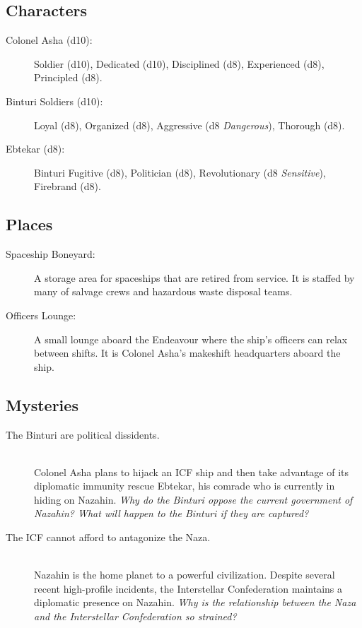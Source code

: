\documentclass[11pt, a5paper, parskip=half-, DIV=12]{scrartcl}
\begin{document}
\newpage

\subsection*{Characters}
\begin{description}
	\item[Colonel Asha (d10):] Soldier (d10), Dedicated (d10), Disciplined (d8), Experienced (d8), Principled (d8).
	\item[Binturi Soldiers (d10):]  Loyal (d8), Organized (d8), Aggressive (d8 \textit{Dangerous}), Thorough (d8). 
	\item[Ebtekar (d8):] Binturi Fugitive (d8), Politician (d8), Revolutionary (d8 \textit{Sensitive}), Firebrand (d8).
\end{description}

\subsection*{Places}
\begin{description}
	\item[Spaceship Boneyard:] A storage area for spaceships that are retired from service. It is staffed by many of salvage crews and hazardous waste disposal teams.
	\item[Officers Lounge:] A small lounge aboard the Endeavour where the ship's officers can relax between shifts. It is Colonel Asha's makeshift headquarters aboard the ship.
\end{description}

\subsection*{Mysteries}
\begin{description}
	\item[The Binturi are political dissidents.] \phantom{a} \\ Colonel Asha plans to hijack an ICF ship and then take advantage of its diplomatic immunity rescue Ebtekar, his comrade who is currently in hiding on Nazahin. \textit{Why do the Binturi oppose the current government of Nazahin? What will happen to the Binturi if they are captured?}
	\item[The ICF cannot afford to antagonize the Naza.] \phantom{} \\ Nazahin is the home planet to a powerful civilization. Despite several recent high-profile incidents, the Interstellar Confederation maintains a diplomatic presence on Nazahin. \textit{Why is the relationship between the Naza and the Interstellar Confederation so strained?}
\end{description}
\end{document}
